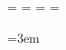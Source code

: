 \documentclass[11pt]{template/thesul}
\begin{document}
\OddHead={{\leftmark\rightmark}{\hfil\slshape\rightmark}}
\EvenHead={{\leftmark}{{\slshape\leftmark}\hfil}}
\OddFoot={\hfil\thepage}
\EvenFoot={\thepage\hfil}
\pagestyle{ThesisHeadingsII}

\emergencystretch=3em




\DontFramePartsInToc
\FrameChaptersInToc

\ResetChaptersAtParts

\setcounter{secnumdepth}{3}
\renewcommand{\thesubsubsection}{\thesubsection.\alph{subsubsection}}



\dominitoc

\end{document}
